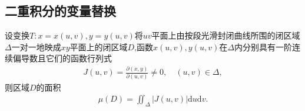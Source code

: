 \documentclass[../../main.tex]{subfiles}%
\begin{document}
\subsection{二重积分的变量替换}

\begin{lemma}\label{lemma:数分---引理21}
设变换$T:x=x(u,v),y=y(u,v)$将$uv$平面上由按段光滑封闭曲线所围的闭区域$\Delta$一对一地映成$xy$平面上的闭区域$D$,函数$x(u,v),y(u,v)$在$\Delta$内分别具有一阶连续偏导数且它们的函数行列式
\begin{align*}
J(u,v)=\frac{\partial(x,y)}{\partial(u,v)}\neq0,\quad(u,v)\in\Delta,
\end{align*}
则区域$D$的面积
\begin{align*}
\mu(D)=\iint_{\Delta}|J(u,v)|\mathrm{d}u\mathrm{d}v.
\end{align*}
\end{lemma}
\end{document}

